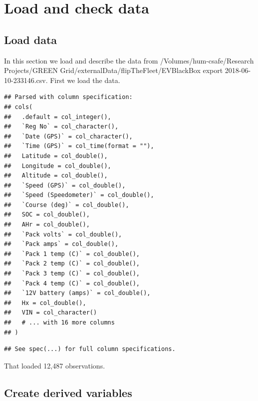 \documentclass[]{article}
\newenvironment{Shaded}{\begin{snugshade}}{\end{snugshade}}
\newcommand{\KeywordTok}[1]{\textcolor[rgb]{0.13,0.29,0.53}{\textbf{#1}}}
\newcommand{\StringTok}[1]{\textcolor[rgb]{0.31,0.60,0.02}{#1}}
\newcommand{\OperatorTok}[1]{\textcolor[rgb]{0.81,0.36,0.00}{\textbf{#1}}}
\newcommand{\NormalTok}[1]{#1}
\begin{document}
\section{Load and check data}\label{load-and-check-data}

\subsection{Load data}\label{load-data}

In this section we load and describe the data from
/Volumes/hum-csafe/Research Projects/GREEN
Grid/externalData/flipTheFleet/EVBlackBox export 2018-06-10-233146.csv.
First we load the data.

\begin{Shaded}
\end{Shaded}

\begin{verbatim}
## Parsed with column specification:
## cols(
##   .default = col_integer(),
##   `Reg No` = col_character(),
##   `Date (GPS)` = col_character(),
##   `Time (GPS)` = col_time(format = ""),
##   Latitude = col_double(),
##   Longitude = col_double(),
##   Altitude = col_double(),
##   `Speed (GPS)` = col_double(),
##   `Speed (Speedometer)` = col_double(),
##   `Course (deg)` = col_double(),
##   SOC = col_double(),
##   AHr = col_double(),
##   `Pack volts` = col_double(),
##   `Pack amps` = col_double(),
##   `Pack 1 temp (C)` = col_double(),
##   `Pack 2 temp (C)` = col_double(),
##   `Pack 3 temp (C)` = col_double(),
##   `Pack 4 temp (C)` = col_double(),
##   `12V battery (amps)` = col_double(),
##   Hx = col_double(),
##   VIN = col_character()
##   # ... with 16 more columns
## )
\end{verbatim}

\begin{verbatim}
## See spec(...) for full column specifications.
\end{verbatim}

That loaded 12,487 observations.

\subsection{Create derived variables}\label{create-derived-variables}
\end{document}

